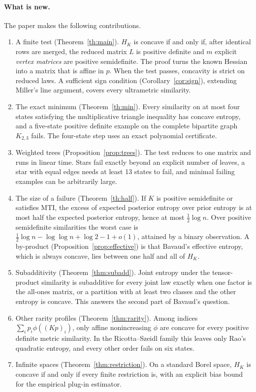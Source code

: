 \documentclass[11pt,a4paper]{article}
\theoremstyle{remark}
\begin{document}
\paragraph{What is new.} The paper makes the following contributions.
\begin{enumerate}
\item A finite test (Theorem~\ref{th:main}). $H_K$ is concave if and only if, after identical rows are merged, the reduced matrix $L$ is positive definite and $m$ explicit \emph{vertex matrices} are positive semidefinite. The proof turns the known Hessian into a matrix that is affine in $p$. When the test passes, concavity is strict on reduced laws. A sufficient sign condition (Corollary~\ref{cor:sign}), extending Miller's line argument, covers every ultrametric similarity.
\item The exact minimum (Theorem~\ref{th:min}). Every similarity on at most four states satisfying the multiplicative triangle inequality has concave entropy, and a five-state positive definite example on the complete bipartite graph $K_{2,3}$ fails. The four-state step uses an exact polynomial certificate.
\item Weighted trees (Proposition~\ref{prop:trees}). The test reduces to one matrix and runs in linear time. Stars fail exactly beyond an explicit number of leaves, a star with equal edges needs at least 13 states to fail, and minimal failing examples can be arbitrarily large.
\item The size of a failure (Theorem~\ref{th:half}). If $K$ is positive semidefinite or satisfies MTI, the excess of expected posterior entropy over prior entropy is at most half the expected posterior entropy, hence at most $\tfrac12\log n$. Over positive semidefinite similarities the worst case is $\tfrac12\log n-\log\log n+\log 2-1+o(1)$, attained by a binary observation. A by-product (Proposition~\ref{prop:effective}) is that Bavaud's effective entropy, which is always concave, lies between one half and all of $H_K$.
\item Subadditivity (Theorem~\ref{thm:subadd}). Joint entropy under the tensor-product similarity is subadditive for every joint law exactly when one factor is the all-ones matrix, or a partition with at least two classes and the other entropy is concave. This answers the second part of Bavaud's question.
\item Other rarity profiles (Theorem~\ref{thm:rarity}). Among indices $\sum_ip_i\phi((Kp)_i)$, only affine nonincreasing $\phi$ are concave for every positive definite metric similarity. In the Ricotta--Szeidl family this leaves only Rao's quadratic entropy, and every other order fails on six states.
\item Infinite spaces (Theorem~\ref{thm:restriction}). On a standard Borel space, $H_K$ is concave if and only if every finite restriction is, with an explicit bias bound for the empirical plug-in estimator.
\end{enumerate}
\end{document}
